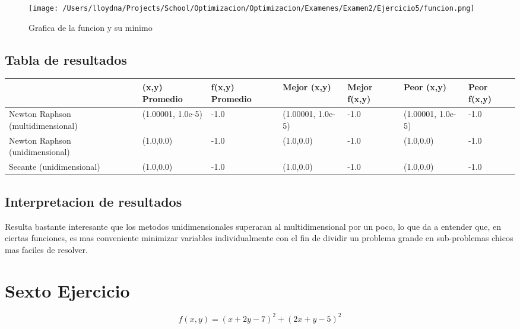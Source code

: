 \documentclass{report}
\begin{document}
            \begin{figure}[H]
                \texttt{[image: /Users/lloydna/Projects/School/Optimizacion/Optimizacion/Examenes/Examen2/Ejercicio5/funcion.png]}
                \caption{Grafica de la funcion y su minimo}
                \label{fig:fun15}
            \end{figure}

            \subsection{Tabla de resultados}
                \begin{tabular}{p{1.5cm}|p{1.5cm}|p{1.5cm}|p{1.5cm}|p{1.5cm}|p{1.5cm}|p{1.5cm}}
                    & (x,y) Promedio & f(x,y) Promedio & Mejor (x,y) & Mejor f(x,y) & Peor (x,y) & Peor f(x,y)\\
                    \hline
                    Newton Raphson (multidimensional) & (1.00001, 1.0e-5) & -1.0 & (1.00001, 1.0e-5) & -1.0 & (1.00001, 1.0e-5) & -1.0\\
                    \hline
                    Newton Raphson (unidimensional) & (1.0,0.0) & -1.0 & (1.0,0.0) & -1.0 & (1.0,0.0) & -1.0\\
                    \hline
                    Secante (unidimensional) & (1.0,0.0) & -1.0 & (1.0,0.0) & -1.0 & (1.0,0.0) & -1.0\\
                    \hline
                \end{tabular}

            \subsection{Interpretacion de resultados}
                Resulta bastante interesante que los metodos unidimensionales superaran al multidimensional por un poco,
                lo que da a entender que, en ciertas funciones, es mas conveniente minimizar variables individualmente con el
                fin de dividir un problema grande en sub-problemas chicos mas faciles de resolver.
        \pagebreak

        \section{Sexto Ejercicio}
            \begin{equation*}
                f(x,y)=(x+2y-7)^2+(2x+y-5)^2
            \end{equation*}
\end{document}
